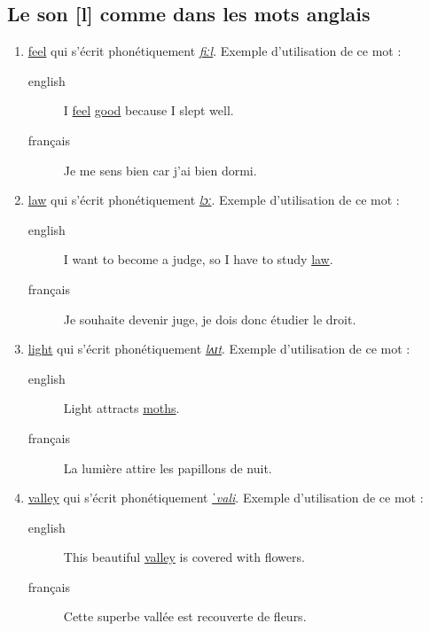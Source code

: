 \documentclass[12pt,a4paper]{book}
\begin{document}
\subsection{Le son [l] comme dans les mots anglais}
\label{sec:org273e167}
\begin{enumerate}
\item \href{http://www.wordreference.com/enfr/feel}{feel} qui s'écrit phonétiquement \href{https://en.oxforddictionaries.com/definition/feel}{\emph{fiːl}}. Exemple d'utilisation de ce
mot : 
\begin{description}
\item[{english}] \textenglish{I \href{https://youtu.be/4k4SP01l6rY}{feel} \href{https://youtu.be/DuDeBcpLITQ}{good} because I slept well.}
\item[{français}] Je me sens bien car j'ai bien dormi.
\end{description}
\item \href{http://www.wordreference.com/enfr/law}{law} qui s'écrit phonétiquement \href{https://en.oxforddictionaries.com/definition/law}{\emph{lɔː}}. Exemple d'utilisation de ce
mot :
\begin{description}
\item[{english}] \textenglish{I want to become a judge, so I have to study \href{https://youtu.be/GEy6ThJwE3s}{law}.}
\item[{français}] Je souhaite devenir juge, je dois donc étudier le droit.
\end{description}
\item \href{http://www.wordreference.com/enfr/light}{light} qui s'écrit phonétiquement \href{https://en.oxforddictionaries.com/definition/light}{\emph{lʌɪt}}. Exemple d'utilisation de ce
mot :
\begin{description}
\item[{english}] \textenglish{Light attracts \href{https://youtu.be/tSkCqj6T\_NQ}{moths}.}
\item[{français}] La lumière attire les papillons de nuit.
\end{description}
\item \href{http://www.wordreference.com/enfr/valley}{valley} qui s'écrit phonétiquement \href{https://en.oxforddictionaries.com/definition/valley}{\emph{ˈvali}}. Exemple d'utilisation de
ce mot :
\begin{description}
\item[{english}] \textenglish{This beautiful \href{https://youtu.be/wQFgG\_HsI0w}{valley} is covered with flowers.}
\item[{français}] Cette superbe vallée est recouverte de fleurs.
\end{description}
\end{enumerate}
\end{document}
